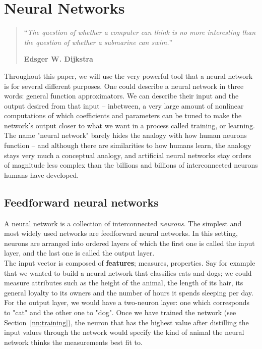 \chapter{Neural Networks}
\begin{quotation}
\noindent ``\emph{The question of whether a computer can think is no more 
	interesting than the question of whether a submarine can swim.}''
\begin{flushright}\textbf{Edsger W. Dijkstra}\end{flushright}
\end{quotation}

\vspace*{0.5cm}

Throughout this paper, we will use the very powerful tool that a neural network
is for several different purposes. One could describe a neural network in 
three words: general function approximators. We can describe their input
and the output desired from that input -- inbetween, a very large amount of
nonlinear computations of which coefficients and parameters can be tuned to
make the network's output closer to what we want in a process called training, 
or learning. The name "neural network"
barely hides the analogy with how human neurons function -- and although there
are similarities to how humans learn, the analogy stays very much a conceptual
analogy, and artificial neural networks stay orders of magnitude less complex
than the billions and billions of interconnected neurons humans have developed. 

\section{Feedforward neural networks}
A neural network is a collection of interconnected \textit{neurons}. The
simplest and most widely used networks are feedforward neural networks. In this
setting, neurons are arranged into ordered layers of which the first one is
called the input layer, and the last one is called the output layer.\\

The input vector is composed of \textbf{features}; measures, properties. Say
for example that we wanted to build a neural network that classifies cats and
dogs; we could measure attributes such as the height of the animal, the length
of its hair, its general loyalty to its owners and the number of hours it 
spends sleeping per day.\\

For the output layer, we would have a two-neuron layer: one which corresponds
to "cat" and the other one to "dog". Once we have trained the network
(see Section~\ref{nn:training}), the neuron that has the highest value
after distilling the input values through the network would specify the
kind of animal the neural network thinks the measurements best fit to.\\

